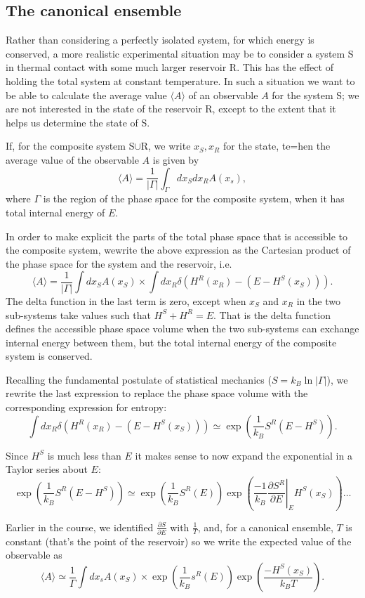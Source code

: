 \subsection*{The canonical ensemble}

Rather than considering a perfectly isolated system, for which energy is conserved, a more realistic experimental situation may be to consider a system S in thermal contact with some much larger reservoir R. This has the effect of holding the total system at constant temperature. In such a situation we want to be able to calculate the average value $\langle A\rangle$ of an observable $A$ for the system S; we are not interested in the state of the reservoir R, except to the extent that it helps us determine the state of S.

If, for the composite system S$\cup$R, we write $x_S,x_R$ for the state, te=hen the average value of the observable $A$ is given by
$$
	\langle A\rangle = \frac{1}{|\Gamma|}\int_{\Gamma}dx_Sdx_RA(x_s),
$$
where $\Gamma$ is the region of the phase space for the composite system, when it has total internal energy of $E$.

In order to make explicit the parts of the total phase space that is accessible to the composite system, wewrite the above expression as the Cartesian product of the phase space for the system and the reservoir, i.e.
$$
	\langle A\rangle =\frac{1}{|\Gamma|}\int dx_SA(x_S)\times\int dx_R\delta(H^R(x_R)-(E-H^S(x_S))).
$$
The delta function in the last term is zero, except when $x_S$ and $x_R$ in the two sub-systems take values such that $H^S+H^R=E$. That is the delta function defines the accessible phase space volume when the two sub-systems can exchange internal energy between them, but the total internal energy of the composite system is conserved.

Recalling the fundamental postulate of statistical mechanics ($S=k_B\ln|\Gamma|$), we rewrite the last expression to replace the phase space volume with the corresponding expression for entropy:
$$
	\int dx_R\delta(H^R(x_R)-(E-H^S(x_S))) \simeq \exp\left(\frac{1}{k_B}S^R(E-H^S)\right).
$$

Since $H^S$ is much less than $E$ it makes sense to now expand the exponential in a Taylor series about $E$:
$$
	\exp\left(\frac{1}{k_B}S^R(E-H^S)\right)\simeq \exp\left(\frac{1}{k_B}S^R(E)\right)\exp\left(\frac{-1}{k_B}\left.\frac{\partial S^R}{\partial E}\right|_E H^S(x_S)\right)\ldots
$$

Earlier in the course, we identified $\frac{\partial S}{\partial E}$ with $\frac{1}{T}$, and, for a canonical ensemble, $T$ is constant (that's the point of the reservoir) so we write the expected value of the observable as
$$
	\langle A\rangle \simeq \frac{1}{\Gamma}\int dx_sA(x_S)\times\exp\left(\frac{1}{k_B}s^R(E)\right)\exp\left(\frac{-H^S(x_S)}{k_BT}\right).
$$

